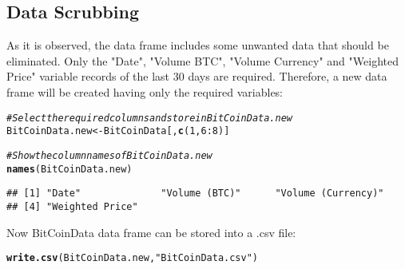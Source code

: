 \documentclass{article}\usepackage[]{graphicx}\usepackage[]{color}
\makeatletter
\newcommand{\hlnum}[1]{\textcolor[rgb]{0.686,0.059,0.569}{#1}}%
\newcommand{\hlstr}[1]{\textcolor[rgb]{0.192,0.494,0.8}{#1}}%
\newcommand{\hlcom}[1]{\textcolor[rgb]{0.678,0.584,0.686}{\textit{#1}}}%
\newcommand{\hlopt}[1]{\textcolor[rgb]{0,0,0}{#1}}%
\newcommand{\hlstd}[1]{\textcolor[rgb]{0.345,0.345,0.345}{#1}}%
\newcommand{\hlkwb}[1]{\textcolor[rgb]{0.69,0.353,0.396}{#1}}%
\newcommand{\hlkwd}[1]{\textcolor[rgb]{0.737,0.353,0.396}{\textbf{#1}}}%
\newenvironment{kframe}{%
 \def\at@end@of@kframe{}%
 \ifinner\ifhmode%
  \def\at@end@of@kframe{\end{minipage}}%
  \begin{minipage}{\columnwidth}%
 \fi\fi%
 \def\FrameCommand##1{\hskip\@totalleftmargin \hskip-\fboxsep
 \colorbox{shadecolor}{##1}\hskip-\fboxsep
     \hskip-\linewidth \hskip-\@totalleftmargin \hskip\columnwidth}%
 \MakeFramed {\advance\hsize-\width
   \@totalleftmargin\z@ \linewidth\hsize
   \@setminipage}}%
 {\par\unskip\endMakeFramed%
 \at@end@of@kframe}
\newenvironment{knitrout}{}{} %
\makeatother
\begin{document}
\subsection{Data Scrubbing}
As it is observed, the data frame includes some unwanted data that should be eliminated. Only the "Date", "Volume BTC", "Volume Currency" and "Weighted Price" variable records of the last 30 days are required. Therefore, a new data frame will be created having only the required variables:
\begin{knitrout}
\color{fgcolor}\begin{kframe}
\begin{alltt}
\hlcom{#Select the required columns and store in BitCoinData.new}
\hlstd{BitCoinData.new}\hlkwb{<-}\hlstd{BitCoinData[,}\hlkwd{c}\hlstd{(}\hlnum{1}\hlstd{,}\hlnum{6}\hlopt{:}\hlnum{8}\hlstd{)]}

\hlcom{#Show the column names of BitCoinData.new}
\hlkwd{names}\hlstd{(BitCoinData.new)}
\end{alltt}
\begin{verbatim}
## [1] "Date"              "Volume (BTC)"      "Volume (Currency)"
## [4] "Weighted Price"
\end{verbatim}
\end{kframe}
\end{knitrout}
Now BitCoinData data frame can be stored into a .csv file:
\begin{knitrout}
\color{fgcolor}\begin{kframe}
\begin{alltt}
\hlkwd{write.csv}\hlstd{(BitCoinData.new,}\hlstr{"BitCoinData.csv"}\hlstd{)}
\end{alltt}
\end{kframe}
\end{knitrout}
\end{document}
